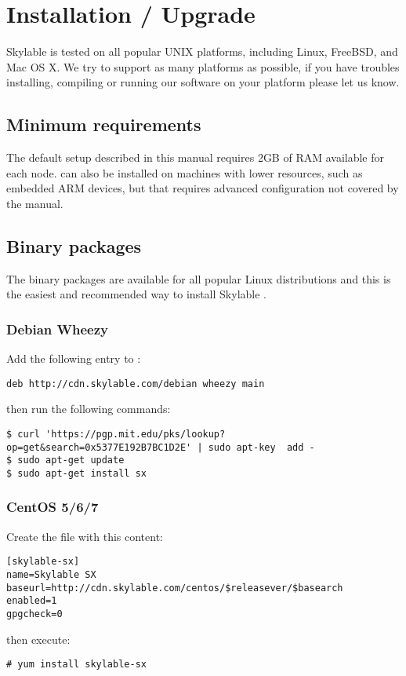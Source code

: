 \chapter{Installation / Upgrade}

Skylable \SX is tested on all popular UNIX platforms, including Linux,
FreeBSD, and Mac OS X. We try to support as many platforms as possible,
if you have troubles installing, compiling or running our software on
your platform please let us know.

\section{Minimum requirements}
The default setup described in this manual requires 2GB of RAM available
for each node. \SX can also be installed on machines with lower resources,
such as embedded ARM devices, but that requires advanced configuration not
covered by the manual.

\section{Binary packages}
The binary packages are available for all popular Linux distributions
and this is the easiest and recommended way to install Skylable \SX.

\subsection{Debian Wheezy}
Add the following entry to :
\begin{lstlisting}
deb http://cdn.skylable.com/debian wheezy main
\end{lstlisting}
then run the following commands:
\begin{lstlisting}
$ curl 'https://pgp.mit.edu/pks/lookup?op=get&search=0x5377E192B7BC1D2E' | sudo apt-key  add -
$ sudo apt-get update
$ sudo apt-get install sx
\end{lstlisting}

\subsection{CentOS 5/6/7}
Create the file  with this content:
\begin{lstlisting}
[skylable-sx]
name=Skylable SX
baseurl=http://cdn.skylable.com/centos/$releasever/$basearch
enabled=1
gpgcheck=0
\end{lstlisting}
then execute:
\begin{lstlisting}
# yum install skylable-sx
\end{lstlisting}

